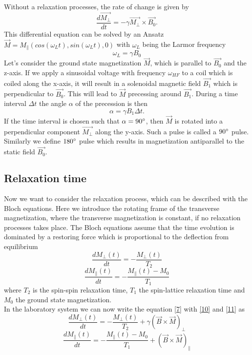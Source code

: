 Without a relaxation processes, the rate of change is given by
\begin{equation}
	\label{7}
	\dfrac{d\vec{M_{\perp}}}{dt} = - \gamma \vec{M_{\perp}} \times \vec{B_{0}}.
\end{equation}
This differential equation can be solved by an Ansatz $\vec{M} = M_{\parallel}(cos(\omega_{L} t),sin(\omega_{L} t),0)$ with $\omega_{L}$ being the Larmor frequency 
\begin{equation}
	\label{8}
	\omega_{L} = \gamma B_{0}
\end{equation}
Let's consider the ground state magnetization $\vec{M}$, which is parallel to $\vec{B_0}$ and the z-axis. If we apply a sinusoidal voltage with frequency $\omega_{HF}$ to a coil which is coiled along the x-axis, it will result in a solenoidal magnetic field $\vec{B_1}$ which is perpendicular to $\vec{B_0}$. This will lead to $\vec{M}$ precessing around $\vec{B_1}$. During a time interval $\Delta t$ the angle $\alpha$ of the precession is then 
\begin{equation}
	\label{9}
	\alpha = \gamma B_{1} \Delta t.
\end{equation}
If the time interval is chosen such that $\alpha = 90 \degree$, then $\vec{M}$ is rotated into a perpendicular component $\vec{M_{\perp}}$ along the y-axis. Such a pulse is called a $90 \degree$ pulse. Similarly we define $180 \degree$ pulse which results in magnetization antiparallel to the static field $\vec{B_{0}}$.
\subsection{Relaxation time}\label{relax}
Now we want to consider the relaxation process, which can be described with the Bloch equations. Here we introduce the rotating frame of the transverse magnetization, where the transverse magnetization is constant, if no relaxation processes takes place. The Bloch equations assume that the time evolution is dominated by a restoring force which is proportional to the deflection from equilibrium
\begin{equation}
	\label{10}
	\dfrac{dM_{\perp}(t)}{dt} = - \dfrac{M_{\perp}(t)}{T_{2}}
\end{equation}
\begin{equation}
	\label{11}
	\dfrac{dM_{\parallel}(t)}{dt} = - \dfrac{M_{\parallel}(t)-M_{0}}{T_{1}}
\end{equation}
where $T_{2}$ is the spin-spin relaxation time, $T_{1}$ the spin-lattice relaxation time and $M_{0}$ the ground state magnetization.
\vspace{3mm}\\
In the laboratory system we can now write the equation \eqref{7} with \eqref{10} and \eqref{11} as
\begin{equation}
	\label{12}
	\dfrac{dM_{\perp}(t)}{dt} = - \dfrac{M_{\perp}(t)}{T_{2}} + \gamma ( \vec{B} \times \vec{M})_{\perp}
\end{equation}
\begin{equation}
	\label{13}
	\dfrac{dM_{\parallel}(t)}{dt} = - \dfrac{M_{\parallel}(t)-M_{0}}{T_{1}} + ( \vec{B} \times \vec{M})_{\parallel}
\end{equation}
